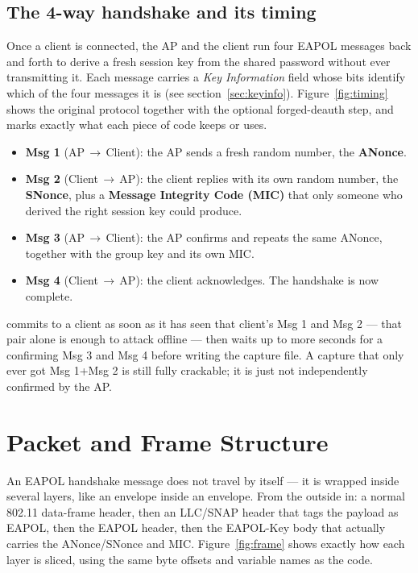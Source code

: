 \subsection{The 4-way handshake and its timing}
Once a client is connected, the AP and the client run four EAPOL messages back and forth to derive a fresh session key from the shared password without ever transmitting it. Each message carries a \emph{Key Information} field whose bits identify which of the four messages it is (see section~\ref{sec:keyinfo}). Figure~\ref{fig:timing} shows the original protocol together with the optional forged-deauth step, and marks exactly what each piece of code keeps or uses.

\FIGTWO

\begin{itemize}
\item \textbf{Msg 1} (AP\,$\rightarrow$\,Client): the AP sends a fresh random number, the \textbf{ANonce}.
\item \textbf{Msg 2} (Client\,$\rightarrow$\,AP): the client replies with its own random number, the \textbf{SNonce}, plus a \textbf{Message Integrity Code (MIC)} that only someone who derived the right session key could produce.
\item \textbf{Msg 3} (AP\,$\rightarrow$\,Client): the AP confirms and repeats the same ANonce, together with the group key and its own MIC.
\item \textbf{Msg 4} (Client\,$\rightarrow$\,AP): the client acknowledges. The handshake is now complete.
\end{itemize}

 commits to a client as soon as it has seen that client's Msg 1 and Msg 2 --- that pair alone is enough to attack offline --- then waits up to  more seconds for a confirming Msg 3 and Msg 4 before writing the capture file. A capture that only ever got Msg 1+Msg 2 is still fully crackable; it is just not independently confirmed by the AP.

\section{Packet and Frame Structure}\label{sec:frame}

An EAPOL handshake message does not travel by itself --- it is wrapped inside several layers, like an envelope inside an envelope. From the outside in: a normal 802.11 data-frame header, then an LLC/SNAP header that tags the payload as EAPOL, then the EAPOL header, then the EAPOL-Key body that actually carries the ANonce/SNonce and MIC. Figure~\ref{fig:frame} shows exactly how each layer is sliced, using the same byte offsets and variable names as the code.

